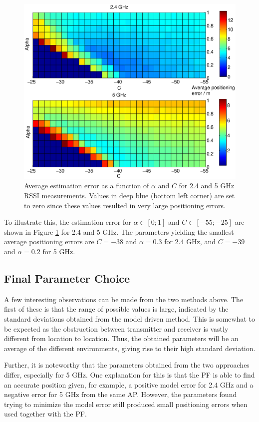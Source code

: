 \documentclass{LTHthesis}
\begin{document}
\begin{figure}[!hbt]

\includegraphics[width=1\textwidth ]{images/pure_rssi/err_vs_param}
\caption{Average estimation error as a function of $\alpha$ and $C$ for 2.4 and 5 GHz RSSI measurements. Values in deep blue (bottom left corner) are set to zero since these values resulted in very large positioning errors.}\label{err_vs_param}
\end{figure}
%
To illustrate this, the estimation error for $\alpha \in [0;1]$ and $C \in [-55;-25]$ are shown in Figure \ref{err_vs_param} for 2.4 and 5 GHz. The parameters yielding the smallest average positioning errors are $C=-38$ and $\alpha = 0.3$ for 2.4 GHz, and $C=-39$ and $\alpha = 0.2$ for 5 GHz. 
%
\subsection{Final Parameter Choice}
%
A few interesting observations can be made from the two methods above. The first of these is that the range of possible values is large, indicated by the standard deviations obtained from the model driven method. This is somewhat to be expected as the obstruction between transmitter and receiver is vastly different from location to location. Thus, the obtained parameters will be an average of the different environments, giving rise to their high standard deviation. 

Further, it is noteworthy that the parameters obtained from the two approaches differ, especially for 5 GHz. One explanation for this is that the PF is able to find an accurate position given, for example, a positive model error for 2.4 GHz and a negative error for 5 GHz from the same AP. However, the parameters found trying to minimize the model error still produced small positioning errors when used together with the PF. 
\end{document}
